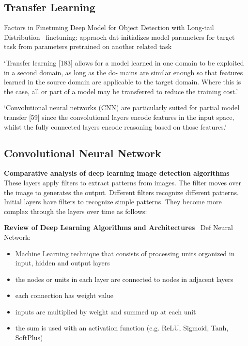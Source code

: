\subsection*{Transfer Learning}
Factors in Finetuning Deep Model for Object Detection with Long-tail
Distribution~\citep{ouyang_factors_2016}
finetuning: appraoch dat initializes model parameters for target task from parameters pretrained on
another related task

`Transfer learning [183] allows for a model learned in one domain to be exploited in a second domain, as long as the do- mains are similar enough so that features learned in the source domain are applicable to the target domain. Where this is the case, all or part of a model may be transferred to reduce the training cost.'~\cite{ashmore_assuring_2021}

`Convolutional neural networks (CNN) are particularly suited for partial model transfer [59] since the convolutional layers encode features in the input space, whilst the fully connected layers encode reasoning based on those features.'~\cite{ashmore_assuring_2021}

\subsection*{Convolutional Neural Network}
\textbf{Comparative analysis of deep learning image detection
algorithms}~\citep{srivastava_comparative_2021}
These layers apply filters to extract patterns from images. The filter moves over the image to generates the output. Different filters recognize different patterns. Initial layers have filters to recognize simple patterns. They become more complex through the layers over time as follows:

\textbf{Review of Deep Learning Algorithms and Architectures}~\citep{shrestha_review_2019}
Def Neural Network:
\begin{itemize}
    \item Machine Learning technique that consists of processing units organized in input,
        hidden and output layers
    \item the nodes or units in each layer are connected to nodes in adjacent layers
    \item each connection has weight value
    \item inputs are multiplied by weight and summed up at each unit
    \item the sum is used with an activation function (e.g. ReLU, Sigmoid, Tanh, SoftPlus)
\end{itemize}

